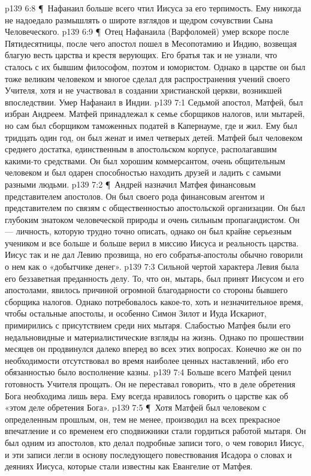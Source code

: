 \vs p139 6:8 \P\ Нафанаил больше всего чтил Иисуса за его терпимость. Ему никогда не надоедало размышлять о широте взглядов и щедром сочувствии Сына Человеческого.
\vs p139 6:9 \P\ Отец Нафанаила (Варфоломей) умер вскоре после Пятидесятницы, после чего апостол пошел в Месопотамию и Индию, возвещая благую весть царства и крестя верующих. Его братья так и не узнали, что сталось с их бывшим философом, поэтом и юмористом. Однако в царстве он был тоже великим человеком и многое сделал для распространения учений своего Учителя, хотя и не участвовал в создании христианской церкви, возникшей впоследствии. Умер Нафанаил в Индии.
\vs p139 7:1 Седьмой апостол, Матфей, был избран Андреем. Матфей принадлежал к семье сборщиков налогов, или мытарей, но сам был сборщиком таможенных податей в Капернауме, где и жил. Ему был тридцать один год, он был женат и имел четверых детей. Матфей был человеком среднего достатка, единственным в апостольском корпусе, располагавшим какими\hyp{}то средствами. Он был хорошим коммерсантом, очень общительным человеком и был одарен способностью находить друзей и ладить с самыми разными людьми.
\vs p139 7:2 \P\ Андрей назначил Матфея финансовым представителем апостолов. Он был своего рода финансовым агентом и представителем по связям с общественностью апостольской организации. Он был глубоким знатоком человеческой природы и очень сильным пропагандистом. Он --- личность, которую трудно точно описать, однако он был крайне серьезным учеником и все больше и больше верил в миссию Иисуса и реальность царства. Иисус так и не дал Левию прозвища, но его собратья\hyp{}апостолы обычно говорили о нем как о «добытчике денег».
\vs p139 7:3 Сильной чертой характера Левия была его беззаветная преданность делу. То, что он, мытарь, был принят Иисусом и его апостолами, явилось причиной огромной благодарности со стороны бывшего сборщика налогов. Однако потребовалось какое\hyp{}то, хоть и незначительное время, чтобы остальные апостолы, и особенно Симон Зилот и Иуда Искариот, примирились с присутствием среди них мытаря. Слабостью Матфея были его недальновидные и материалистические взгляды на жизнь. Однако по прошествии месяцев он продвинулся далеко вперед во всех этих вопросах. Конечно же он по необходимости отсутствовал во время наиболее ценных наставлений, ибо его обязанностью было восполнение казны.
\vs p139 7:4 Больше всего Матфей ценил готовность Учителя прощать. Он не переставал говорить, что в деле обретения Бога необходима лишь вера. Ему всегда нравилось говорить о царстве как об «этом деле обретения Бога».
\vs p139 7:5 \P\ Хотя Матфей был человеком с определенным прошлым, он, тем не менее, производил на всех прекрасное впечатление и со временем его сподвижники стали гордиться работой мытаря. Он был одним из апостолов, кто делал подробные записи того, о чем говорил Иисус, и эти записи легли в основу последующего повествования Исадора о словах и деяниях Иисуса, которые стали известны как Евангелие от Матфея.
